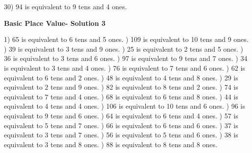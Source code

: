 \documentclass{article}%
\begin{document}
30) 94 is equivalent to  9 tens and 4 ones.%
\newline%
\newpage%
\large%
\begin{center}%
\textbf{Basic Place Value- Solution 3}%
\newline%
\end{center} \normalsize%
1) 65 is equivalent to  6 tens and 5 ones.%
) 109 is equivalent to  10 tens and 9 ones.%
) 39 is equivalent to  3 tens and 9 ones.%
) 25 is equivalent to  2 tens and 5 ones.%
) 36 is equivalent to  3 tens and 6 ones.%
) 97 is equivalent to  9 tens and 7 ones.%
) 34 is equivalent to  3 tens and 4 ones.%
) 76 is equivalent to  7 tens and 6 ones.%
) 62 is equivalent to  6 tens and 2 ones.%
) 48 is equivalent to  4 tens and 8 ones.%
) 29 is equivalent to  2 tens and 9 ones.%
) 82 is equivalent to  8 tens and 2 ones.%
) 74 is equivalent to  7 tens and 4 ones.%
) 68 is equivalent to  6 tens and 8 ones.%
) 44 is equivalent to  4 tens and 4 ones.%
) 106 is equivalent to  10 tens and 6 ones.%
) 96 is equivalent to  9 tens and 6 ones.%
) 64 is equivalent to  6 tens and 4 ones.%
) 57 is equivalent to  5 tens and 7 ones.%
) 66 is equivalent to  6 tens and 6 ones.%
) 37 is equivalent to  3 tens and 7 ones.%
) 56 is equivalent to  5 tens and 6 ones.%
) 38 is equivalent to  3 tens and 8 ones.%
) 88 is equivalent to  8 tens and 8 ones.%
\newline%
\end{document}
